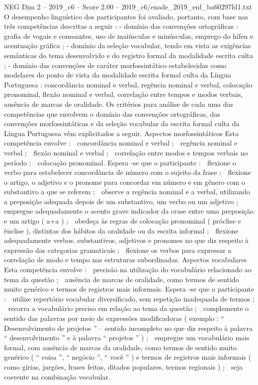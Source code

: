 \begin{textsample}{NEG Dim 2 – 2019\_c6 – Score 2.00 – 2019\_c6/enade\_2019\_enf\_ba60297fd1.txt}
O desempenho linguístico dos participantes foi avaliado, portanto, com base nas três competências descritas a seguir : - domínio das convenções ortográficas : grafia de vogais e consoantes, uso de maiúsculas e minúsculas, emprego do hífen e acentuação gráfica ; - domínio da seleção vocabular, tendo em vista as exigências semânticas do tema desenvolvido e do registro formal da modalidade escrita culta ; - domínio das convenções de caráter morfossintático estabelecidas como modelares do ponto de vista da modalidade escrita formal culta da Língua Portuguesa : concordância nominal e verbal, regência nominal e verbal, colocação pronominal, flexão nominal e verbal, correlação entre tempos e modos verbais, ausência de marcas de oralidade.
Os critérios para análise de cada uma das competências que envolvem o domínio das convenções ortográficas, das convenções morfossintáticas e da seleção vocabular da escrita formal culta da Língua Portuguesa vêm explicitados a seguir.
Aspectos morfossintáticos Esta competência envolve :  concordância nominal e verbal ;  regência nominal e verbal ;  flexão nominal e verbal ;  correlação entre modos e tempos verbais no período ;  colocação pronominal.
Espera -se que o participante :  flexione o verbo para estabelecer concordância de número com o sujeito da frase ;  flexione o artigo, o adjetivo e o pronome para concordar em número e em gênero com o substantivo a que se referem ;  observe a regência nominal e a verbal, utilizando a preposição adequada depois de um substantivo, um verbo ou um adjetivo ;  empregue adequadamente o acento grave indicador da crase entre uma preposição e um artigo ( a+a ) ;  obedeça às regras de colocação pronominal ( próclise e ênclise ), distintas dos hábitos da oralidade ou da escrita informal ;  flexione adequadamente verbos, substantivos, adjetivos e pronomes no que diz respeito à expressão das categorias gramaticais ;  flexione os verbos para expressar a correlação de modo e tempo nas estruturas subordinadas.
Aspectos vocabulares Esta competência envolve :  precisão na utilização do vocabulário relacionado ao tema da questão ;  ausência de marcas de oralidade, como termos de sentido muito genérico e termos de registros mais informais.
Espera -se que o participante :  utilize repertório vocabular diversificado, sem repetição inadequada de termos ;  recorra a vocabulário preciso em relação ao tema da questão ;  complemente o sentido das palavras por meio de expressões modificadoras ( exemplo : “ Desenvolvimento de projetos ” – sentido incompleto no que diz respeito à palavra “ desenvolvimento ” e à palavra “ projetos ” ) ;  empregue um vocabulário mais formal, com ausência de marcas da oralidade, como termos de sentido muito genérico ( “ coisa ”, “ negócio ”, “ você ” ) e termos de registros mais informais ( como gírias, jargões, frases feitas, ditados populares, termos regionais ) ;  seja coerente na combinação vocabular.

\end{textsample}
